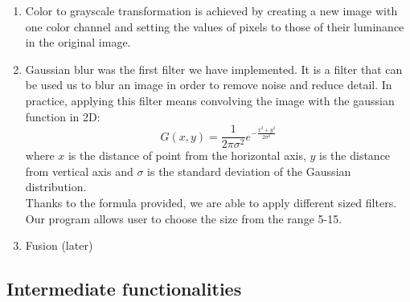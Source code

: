 \documentclass[a4paper,12pt]{article}
\begin{document}
\begin{enumerate}
	 \item Color to grayscale transformation is achieved by creating a new image with one color channel and setting the values of pixels to those of their luminance in the original image.

	 \item Gaussian blur was the first filter we have implemented. It is a filter that can be used us to blur an image in order to remove noise and reduce detail. In practice, applying this filter means convolving the image with the gaussian function in 2D:
$$G(x,y)=\frac{1}{2\pi\sigma^2}e^{-\frac{x^{2}+y^{2}}{2\sigma^2}}$$
where $x$ is the distance of point from the horizontal axis, $y$ is the distance from vertical axis and $\sigma$ is the standard deviation of the Gaussian distribution.\\
Thanks to the formula provided, we are able to apply different sized filters. Our program allows user to choose the size from the range 5-15.

	 \item Fusion (later)

\end{enumerate}

\subsection{Intermediate functionalities}
\end{document}
